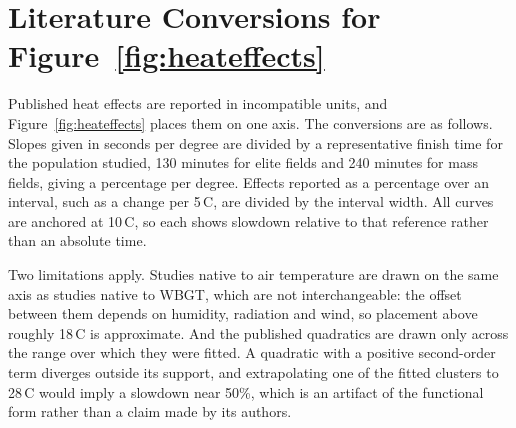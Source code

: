\section{Literature Conversions for Figure~\ref{fig:heateffects}}
\label{app:conversions}

Published heat effects are reported in incompatible units, and Figure~\ref{fig:heateffects} places them
on one axis. The conversions are as follows. Slopes given in seconds per degree are divided by a
representative finish time for the population studied, 130 minutes for elite fields and 240 minutes
for mass fields, giving a percentage per degree. Effects reported as a percentage over an interval,
such as a change per 5\,\textdegree C, are divided by the interval width. All curves are anchored at
10\,\textdegree C, so each shows slowdown relative to that reference rather than an absolute time.

Two limitations apply. Studies native to air temperature are drawn on the same axis as studies native
to WBGT, which are not interchangeable: the offset between them depends on humidity, radiation and
wind, so placement above roughly 18\,\textdegree C is approximate. And the published quadratics are
drawn only across the range over which they were fitted. A quadratic with a positive second-order
term diverges outside its support, and extrapolating one of the fitted clusters to 28\,\textdegree C
would imply a slowdown near 50\%, which is an artifact of the functional form rather than a claim
made by its authors.

